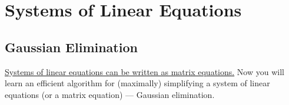\chapter{Systems of Linear Equations }
\label{systems}

\section{Gaussian Elimination}
\label{gaussElim}

\hyperlink{system2matrix}{Systems of linear equations can be written as matrix equations.}
Now you will learn  an efficient algorithm  for (maximally) simplifying a system of linear equations (or a matrix equation) --- Gaussian elimination.




